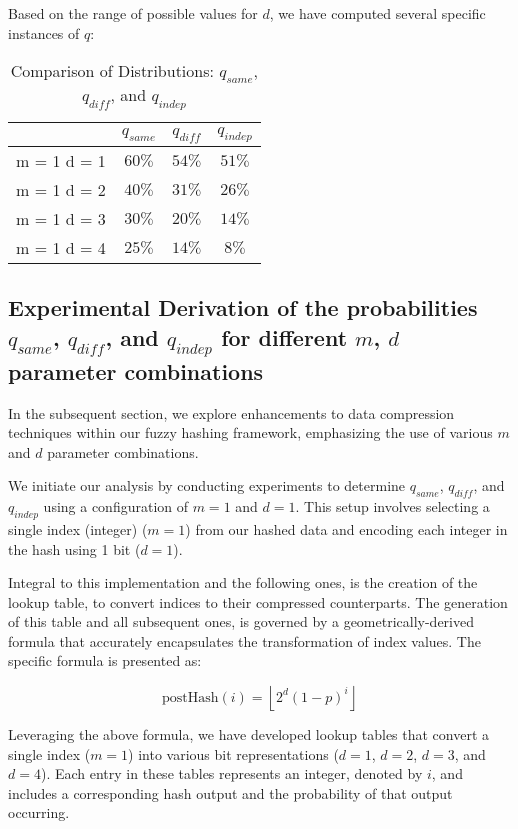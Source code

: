 Based on the range of possible values for \(d\), we have computed several specific instances of \(q\):
\begin{table}[H]
    \centering
    \renewcommand{\arraystretch}{1.25}\begin{tabular}{|c|c|c|c|}
        \hline
        & $q_{same}$ & $q_{diff}$ & $q_{indep}$\\
        \hline
        m = 1 d = 1 & $60\%$ & $54\%$ & $51\%$\\
        m = 1 d = 2 & $40\%$ & $31\%$ & $26\%$\\
        m = 1 d = 3 & $30\%$ & $20\%$ & $14\%$\\
        m = 1 d = 4 & $25\%$ & $14\%$ & $8\%$\\
        \hline
    \end{tabular}
\caption{Comparison of Distributions: $q_{same}$, $q_{diff}$, and $q_{indep}$}
\end{table}

\subsection{Experimental Derivation of the probabilities $q_{same}$, $q_{diff}$, and $q_{indep}$ for different \(m\), \(d\) parameter combinations}

In the subsequent section, we explore enhancements to data compression techniques within our fuzzy hashing framework, emphasizing the use of various \(m\) and \(d\) parameter combinations.

We initiate our analysis by conducting experiments to determine \(q_{same}\), \(q_{diff}\), and \(q_{indep}\) using a configuration of \(m=1\) and \(d=1\). This setup involves selecting a single index (integer) (\(m=1\)) from our hashed data and encoding each integer in the hash using 1 bit (\(d=1\)). 

Integral to this implementation and the following ones, is the creation of the lookup table, to convert indices to their compressed counterparts. The generation of this table and all subsequent ones, is governed by a geometrically-derived formula that accurately encapsulates the transformation of index values. The specific formula is presented as:

\[ 
\text{postHash}(i) = \left\lfloor 2^d \left(1 - p\right)^i \right\rfloor
\]

Leveraging the above formula, we have developed lookup tables that convert a single index (\(m = 1\)) into various bit representations (\(d=1\), \(d=2\), \(d=3\), and \(d=4\)). Each entry in these tables represents an integer, denoted by \(i\), and includes a corresponding hash output and the probability of that output occurring.

